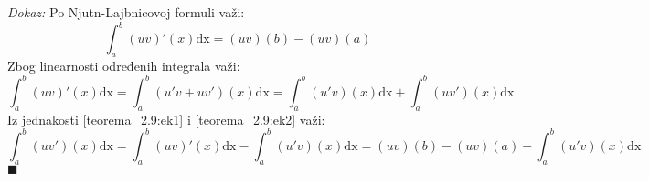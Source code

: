 \documentclass{article}
\begin{document}
\textit{Dokaz:} Po Njutn-Lajbnicovoj formuli važi:
\begin{equation}
    \label{teorema_2.9:ek1}
    \displaystyle\int^b_a \left(uv\right)'\left(x\right)\text{dx} = \left(uv\right)\left(b\right) - \left(uv\right)\left(a\right)
\end{equation}
Zbog linearnosti određenih integrala važi:
\begin{equation}
    \label{teorema_2.9:ek2}
    \displaystyle\int^b_a \left(uv\right)'\left(x\right)\text{dx} = \int^b_a\left(u'v + uv'\right)\left(x\right)\text{dx} = \int^b_a\left(u'v\right)\left(x\right)\text{dx} + \int^b_a\left(uv'\right)\left(x\right)\text{dx}
\end{equation}
Iz jednakosti \eqref{teorema_2.9:ek1} i \eqref{teorema_2.9:ek2} važi:
$$\int^b_a\left(uv'\right)\left(x\right)\text{dx}=\displaystyle\int^b_a \left(uv\right)'\left(x\right)\text{dx} - \int^b_a\left(u'v\right)\left(x\right)\text{dx}= \left(uv\right)\left(b\right) - \left(uv\right)\left(a\right) - \int^b_a\left(u'v\right)\left(x\right)\text{dx}$$
\null\hfill $\blacksquare$\par
\end{document}
